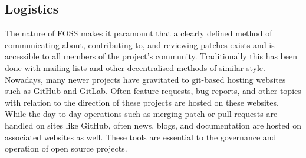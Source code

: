 \documentclass[manuscript,screen,nonacm,12pt]{acmart}
\begin{document}
\subsection{Logistics}
The nature of FOSS makes it paramount that a clearly defined method of
communicating about, contributing to, and reviewing patches exists and is
accessible to all members of the project's community. Traditionally this has
been done with mailing lists and other decentralised methods of similar style.
Nowadays, many newer projects have gravitated to git-based hosting websites such
as GitHub and GitLab. Often feature requests, bug reports, and other topics with
relation to the direction of these projects are hosted on these websites. While
the day-to-day operations such as merging patch or pull requests are handled on
sites like GitHub, often news, blogs, and documentation are hosted on associated
websites as well. These tools are essential to the governance and operation of
open source projects.
\end{document}
